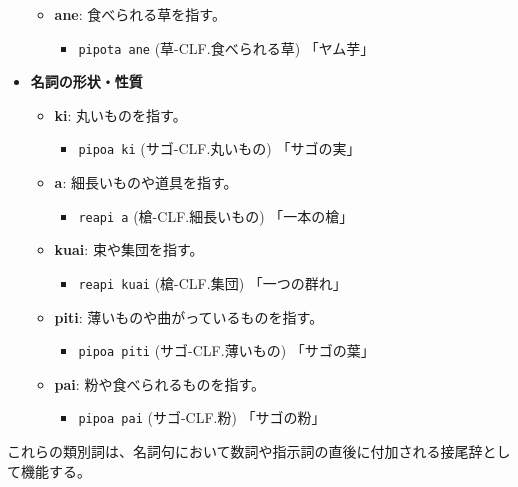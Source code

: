 \begin{itemize}
\begin{itemize}
            \item \textbf{ane}: 食べられる草を指す。
                \begin{itemize}
                    \item \texttt{pipota ane} (草-CLF.食べられる草)
                    \quad 「ヤム芋」
                \end{itemize}
        \end{itemize}
    \item \textbf{名詞の形状・性質}
        \begin{itemize}
            \item \textbf{ki}: 丸いものを指す。
                \begin{itemize}
                    \item \texttt{pipoa ki} (サゴ-CLF.丸いもの)
                    \quad 「サゴの実」
                \end{itemize}
            \item \textbf{a}: 細長いものや道具を指す。
                \begin{itemize}
                    \item \texttt{reapi a} (槍-CLF.細長いもの)
                    \quad 「一本の槍」
                \end{itemize}
            \item \textbf{kuai}: 束や集団を指す。
                \begin{itemize}
                    \item \texttt{reapi kuai} (槍-CLF.集団)
                    \quad 「一つの群れ」
                \end{itemize}
            \item \textbf{piti}: 薄いものや曲がっているものを指す。
                \begin{itemize}
                    \item \texttt{pipoa piti} (サゴ-CLF.薄いもの)
                    \quad 「サゴの葉」
                \end{itemize}
            \item \textbf{pai}: 粉や食べられるものを指す。
                \begin{itemize}
                    \item \texttt{pipoa pai} (サゴ-CLF.粉)
                    \quad 「サゴの粉」
                \end{itemize}
        \end{itemize}
\end{itemize}
これらの類別詞は、名詞句において数詞や指示詞の直後に付加される接尾辞として機能する。


